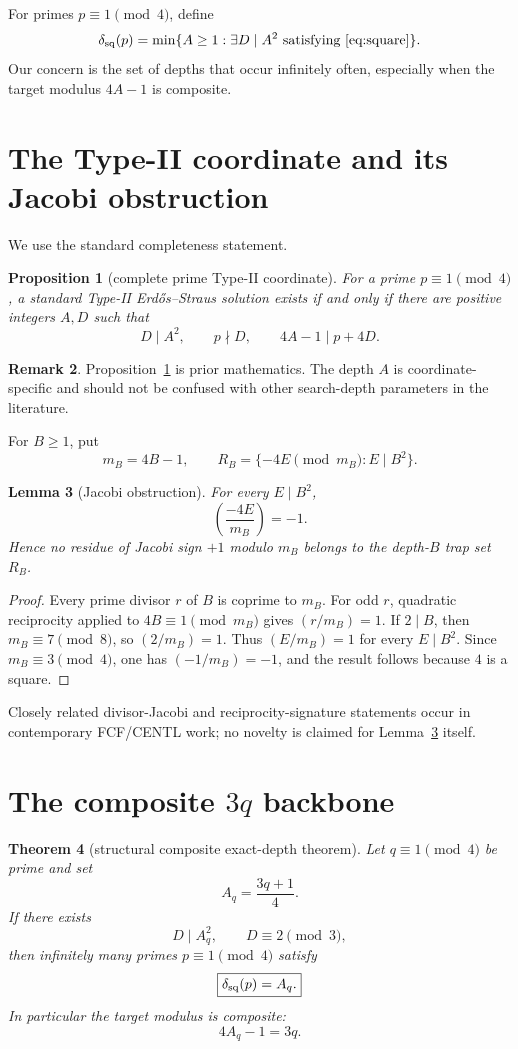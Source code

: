 \documentclass[11pt]{article}
\newtheorem{theorem}{Theorem}
\newtheorem{lemma}[theorem]{Lemma}
\newtheorem{proposition}[theorem]{Proposition}
\theoremstyle{definition}
\newtheorem{remark}[theorem]{Remark}
\newcommand{\sqdepth}{\delta_{\rm sq}}
\begin{document}
For primes $p\equiv1\pmod4$, define
\[
\sqdepth(p)=\min\{A\ge1:\exists D\mid A^2\text{ satisfying \eqref{eq:square}}\}.
\]
Our concern is the set of depths that occur infinitely often, especially when the target modulus $4A-1$ is composite.

\section{The Type-II coordinate and its Jacobi obstruction}
We use the standard completeness statement.

\begin{proposition}[complete prime Type-II coordinate]\label{prop:complete}
For a prime $p\equiv1\pmod4$, a standard Type-II Erd\H{o}s--Straus solution exists if and only if there are positive integers $A,D$ such that
\[
D\mid A^2,\qquad p\nmid D,\qquad 4A-1\mid p+4D.
\]
\end{proposition}

\begin{remark}
Proposition~\ref{prop:complete} is prior mathematics. The depth $A$ is coordinate-specific and should not be confused with other search-depth parameters in the literature.
\end{remark}

For $B\ge1$, put
\[
m_B=4B-1,
\qquad
R_B=\{-4E\pmod{m_B}:E\mid B^2\}.
\]

\begin{lemma}[Jacobi obstruction]\label{lem:jacobi}
For every $E\mid B^2$,
\[
\boxed{\left(\frac{-4E}{m_B}\right)=-1.}
\]
Hence no residue of Jacobi sign $+1$ modulo $m_B$ belongs to the depth-$B$ trap set $R_B$.
\end{lemma}

\begin{proof}
Every prime divisor $r$ of $B$ is coprime to $m_B$. For odd $r$, quadratic reciprocity applied to $4B\equiv1\pmod{m_B}$ gives $(r/m_B)=1$. If $2\mid B$, then $m_B\equiv7\pmod8$, so $(2/m_B)=1$. Thus $(E/m_B)=1$ for every $E\mid B^2$. Since $m_B\equiv3\pmod4$, one has $(-1/m_B)=-1$, and the result follows because $4$ is a square.
\end{proof}

Closely related divisor-Jacobi and reciprocity-signature statements occur in contemporary FCF/CENTL work; no novelty is claimed for Lemma~\ref{lem:jacobi} itself.

\section{The composite $3q$ backbone}
\begin{theorem}[structural composite exact-depth theorem]\label{thm:backbone}
Let $q\equiv1\pmod4$ be prime and set
\[
A_q=\frac{3q+1}{4}.
\]
If there exists
\[
D\mid A_q^2,
\qquad
D\equiv2\pmod3,
\]
then infinitely many primes $p\equiv1\pmod4$ satisfy
\[
\boxed{\sqdepth(p)=A_q.}
\]
In particular the target modulus is composite:
\[
4A_q-1=3q.
\]
\end{theorem}
\end{document}
